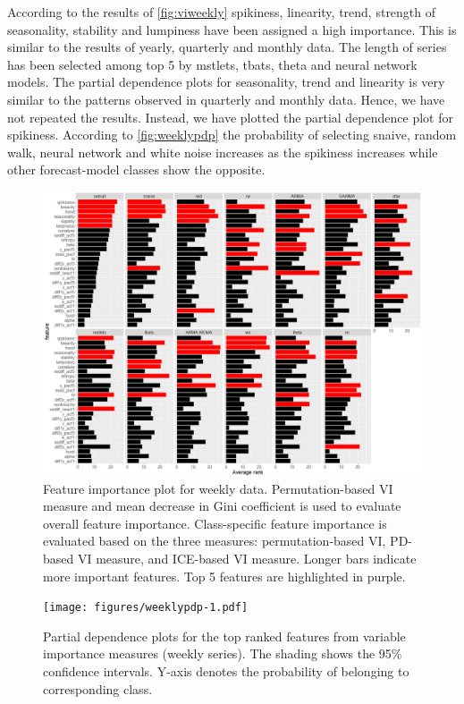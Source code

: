 \documentclass[11pt,a4paper,]{article}
\begin{document}
According to the results of \autoref{fig:viweekly} spikiness, linearity, trend, strength of seasonality, stability and lumpiness have been assigned a high importance. This is similar to the results of yearly, quarterly and monthly data. The length of series has been selected among top 5 by mstlets, tbats, theta and neural network models. The partial dependence plots for seasonality, trend and linearity is very similar to the patterns observed in quarterly and monthly data. Hence, we have not repeated the results. Instead, we have plotted the partial dependence plot for spikiness. According to \autoref{fig:weeklypdp} the probability of selecting snaive, random walk, neural network and white noise increases as the spikiness increases while other forecast-model classes show the opposite.

\begin{figure}[h]

{\centering \includegraphics{figures/viweekly-1} 

}

\caption{Feature importance plot for weekly data. Permutation-based VI measure and mean decrease in Gini coefficient is used to evaluate overall feature importance. Class-specific feature importance is evaluated based on the three measures: permutation-based VI, PD-based VI measure, and ICE-based VI measure. Longer bars indicate more important features. Top 5 features are highlighted in purple.}\label{fig:viweekly}
\end{figure}

\begin{figure}
\centering
\texttt{[image: figures/weeklypdp-1.pdf]}
\caption{\label{fig:weeklypdp}Partial dependence plots for the top ranked features from variable importance measures (weekly series). The shading shows the 95\% confidence intervals. Y-axis denotes the probability of belonging to corresponding class.}
\end{figure}
\end{document}
